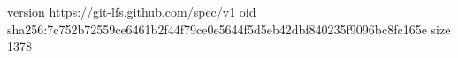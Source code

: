 version https://git-lfs.github.com/spec/v1
oid sha256:7c752b72559ce6461b2f44f79ce0e5644f5d5eb42dbf840235f9096bc8fc165e
size 1378

